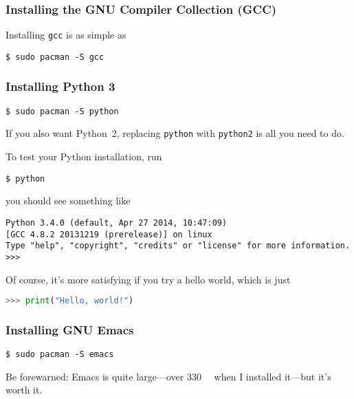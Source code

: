 \documentclass[12pt,letterpaper]{article}
\begin{document}
\subsubsection{Installing the GNU Compiler Collection (GCC)}

Installing \lstinline{gcc} is as simple as
\begin{lstlisting}
$ sudo pacman -S gcc
\end{lstlisting}



\subsubsection{Installing Python 3}

\begin{lstlisting}
$ sudo pacman -S python
\end{lstlisting}

If you also want Python~2, replacing \lstinline{python} with \lstinline{python2} is all you need to do.

To test your Python installation, run
\begin{lstlisting}
$ python
\end{lstlisting}
you should see something like
\begin{lstlisting}
Python 3.4.0 (default, Apr 27 2014, 10:47:09) 
[GCC 4.8.2 20131219 (prerelease)] on linux
Type "help", "copyright", "credits" or "license" for more information.
>>>
\end{lstlisting}
Of course, it's more satisfying if you try a hello world, which is just
\begin{lstlisting}[language=python,showstringspaces=false,basicstyle=\ttfamily]
>>> print("Hello, world!")
\end{lstlisting}

\subsubsection{Installing GNU Emacs}
\begin{lstlisting}
$ sudo pacman -S emacs
\end{lstlisting}

Be forewarned: Emacs is quite large---over \SI{330}{\mebi\bytes} when I installed it---but it's worth it.
\end{document}
